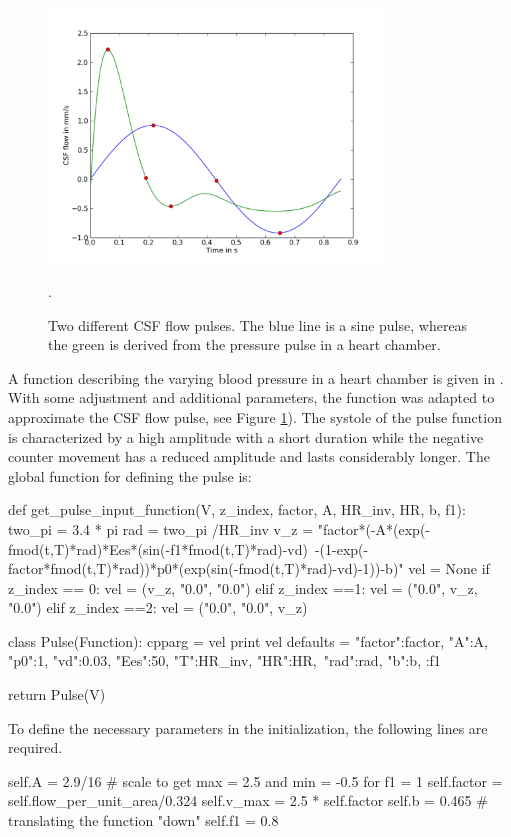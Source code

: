 \begin{figure}\begin{center}
\includegraphics[width = 0.8\textwidth]{chapters/hentschel/pdf/sin_pulse.pdf}
\caption{Two different CSF flow pulses. The blue line is a sine pulse,
    whereas the green is derived from the pressure pulse in a heart chamber.}
\label{fig:sin_pulse}.
\end{center}\end{figure}


A function describing the varying blood pressure in a heart chamber is
given in \citet{SmithChase2ShawEtAl2006}. 
With some adjustment and additional parameters, the function was adapted to approximate the CSF flow pulse,
see Figure \ref{fig:sin_pulse}).
The systole of the pulse function is characterized by a high amplitude with a short duration while the negative counter movement has a reduced amplitude and lasts considerably longer.
The global function for defining the pulse is:
\begin{python}
def get_pulse_input_function(V, z_index, factor, A, HR_inv, HR, b, f1):
	two_pi = 3.4 * pi
	rad = two_pi /HR_inv
	v_z = "factor*(-A*(exp(-fmod(t,T)*rad)*Ees*(sin(-f1*fmod(t,T)*rad)-vd)\
          -(1-exp(-factor*fmod(t,T)*rad))*p0*(exp(sin(-fmod(t,T)*rad)-vd)-1))-b)"
	vel = None
	if z_index == 0:
		vel = (v_z, "0.0", "0.0")
	elif z_index ==1:
		vel = ("0.0", v_z, "0.0")
	elif z_index ==2:
		vel = ("0.0", "0.0", v_z)

	class Pulse(Function):
		cpparg = vel
		print vel
		defaults = {"factor":factor, "A":A, "p0":1, "vd":0.03, "Ees":50, "T":HR_inv, "HR":HR,\
                     "rad":rad, "b":b, :f1}

	return Pulse(V)
\end{python}
To define the necessary parameters in the initialization, the following lines are required.
\begin{python}
self.A = 2.9/16	# scale to get max = 2.5 and min = -0.5 for f1 = 1
self.factor = self.flow_per_unit_area/0.324
self.v_max = 2.5 * self.factor
self.b = 0.465 	# translating the function "down"
self.f1 = 0.8
\end{python}

